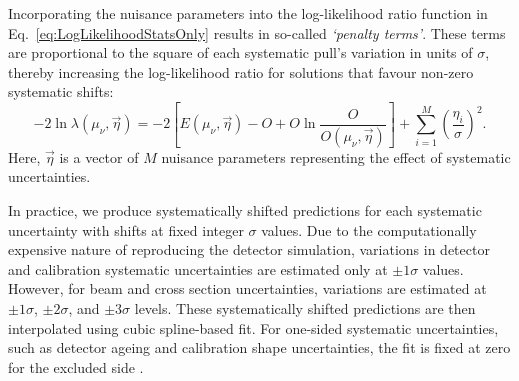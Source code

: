 Incorporating the nuisance parameters into the log-likelihood ratio function in Eq.~\ref{eq:LogLikelihoodStatsOnly} results in so-called \textit{`penalty terms'}. These terms are proportional to the square of each systematic pull's variation in units of $\sigma$, thereby increasing the log-likelihood ratio for solutions that favour non-zero systematic shifts:
\begin{equation}\label{eq:FullLogLikelihood}
-2\ln\lambda\left(\mu_\nu,\overrightarrow{\eta}\right)=-2\left[E\left(\mu_\nu,\overrightarrow{\eta}\right)-O+O\ln\frac{O}{O\left(\mu_\nu,\overrightarrow{\eta}\right)}\right] + \sum_{i=1}^{M}\left(\frac{\eta_i}{\sigma}\right)^2.
\end{equation}
Here, $\overrightarrow{\eta}$ is a vector of $M$ nuisance parameters representing the effect of systematic uncertainties.

In practice, we produce systematically shifted predictions for each systematic uncertainty with shifts at fixed integer $\sigma$ values. Due to the computationally expensive nature of reproducing the detector simulation, variations in detector and calibration systematic uncertainties are estimated only at $\pm 1\sigma$ values. However, for beam and cross section uncertainties, variations are estimated at $\pm 1\sigma$, $\pm 2\sigma$, and $\pm 3\sigma$ levels. These systematically shifted predictions are then interpolated using cubic spline-based fit. For one-sided systematic uncertainties, such as detector ageing and calibration shape uncertainties, the fit is fixed at zero for the excluded side \cite{NitishOscMeasuremetPCAStatisticalAna2021.pdf}.



